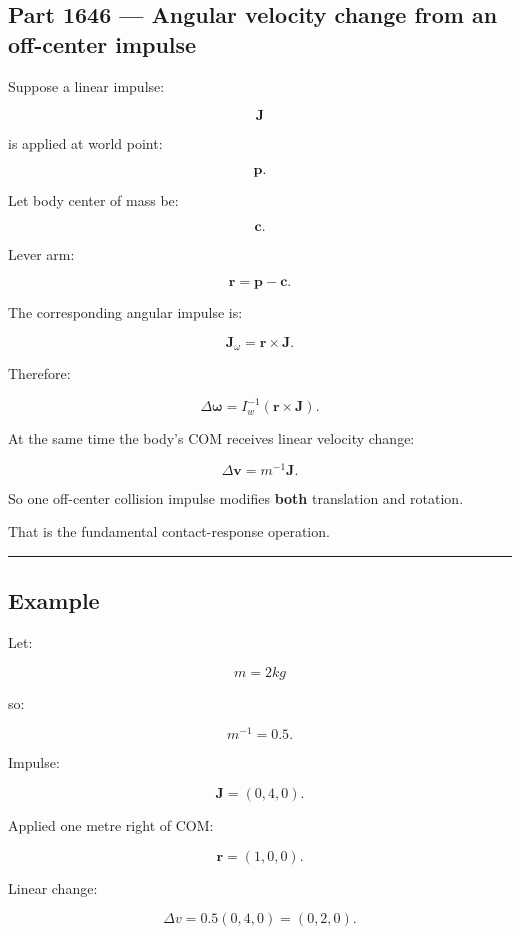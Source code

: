 \subsection{Part 1646 --- Angular velocity change from an off-center impulse}\label{06-engine-ii-ch036-part-1646-angular-velocity-change-from-an-off-center-impulse}

Suppose a linear impulse:

\[
\mathbf J
\]

is applied at world point:

\[
\mathbf p.
\]

Let body center of mass be:

\[
\mathbf c.
\]

Lever arm:

\[
\mathbf r
=
\mathbf p-\mathbf c.
\]

The corresponding angular impulse is:

\[
\boxed{
\mathbf J_\omega
=
\mathbf r\times\mathbf J.
}
\]

Therefore:

\[
\boxed{
\Delta\boldsymbol\omega
=
I_w^{-1}
(
\mathbf r\times\mathbf J
).
}
\]

At the same time the body's COM receives linear velocity change:

\[
\boxed{
\Delta\mathbf v
=
m^{-1}\mathbf J.
}
\]

So one off-center collision impulse modifies \textbf{both} translation and rotation.

That is the fundamental contact-response operation.

\begin{center}\rule{0.5\linewidth}{0.5pt}\end{center}

\subsection{Example}\label{06-engine-ii-ch036-example}

Let:

\[
m=2kg
\]

so:

\[
m^{-1}=0.5.
\]

Impulse:

\[
\mathbf J=(0,4,0).
\]

Applied one metre right of COM:

\[
\mathbf r=(1,0,0).
\]

Linear change:

\[
\Delta v
=
0.5(0,4,0)
=
(0,2,0).
\]

